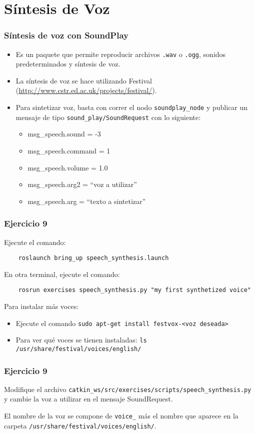 \section{Síntesis de Voz}

\begin{frame}\frametitle{Síntesis de voz con SoundPlay}
  \begin{itemize}
  \item Es un paquete que permite reproducir archivos \texttt{.wav} o \texttt{.ogg}, sonidos predeterminados y síntesis de voz.
  \item La síntesis de voz se hace utilizando Festival (\url{http://www.cstr.ed.ac.uk/projects/festival/}).
  \item Para sintetizar voz, basta con correr el nodo \texttt{soundplay\_node} y publicar un mensaje de tipo \texttt{sound\_play/SoundRequest} con lo siguiente:
    \begin{itemize}
    \item msg\_speech.sound   = -3                 
    \item msg\_speech.command = 1                  
    \item msg\_speech.volume  = 1.0                
    \item msg\_speech.arg2    = ``voz a utilizar''
    \item msg\_speech.arg = ``texto a sintetizar''
    \end{itemize}
  \end{itemize}
\end{frame}

\begin{frame}[containsverbatim]\frametitle{Ejercicio 9}
  Ejecute el comando:
  \begin{lstlisting}
    roslaunch bring_up speech_synthesis.launch
  \end{lstlisting}
  En otra terminal, ejecute el comando:
  \begin{lstlisting}
    rosrun exercises speech_synthesis.py "my first synthetized voice"
  \end{lstlisting}
  Para instalar más voces:
  \begin{itemize}
  \item Ejecute el comando \texttt{sudo apt-get install festvox-<voz deseada>}
  \item Para ver qué voces se tienen instaladas: \texttt{ls /usr/share/festival/voices/english/}
  \end{itemize}
\end{frame}

\begin{frame}[containsverbatim]\frametitle{Ejercicio 9}
  Modifique el archivo \texttt{catkin\_ws/src/exercises/scripts/speech\_synthesis.py} y cambie la voz a utilizar en el mensaje SoundRequest.
  
  El nombre de la voz se compone de \texttt{voice\_} más el nombre que aparece en la carpeta \texttt{/usr/share/festival/voices/english/}. 
\end{frame}
